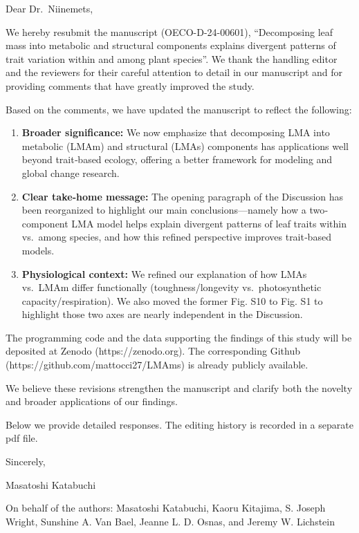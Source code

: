 \documentclass[
  12pt,
  letterpaper,
  DIV=11,
  numbers=noendperiod]{scrartcl}
\author{Masatoshi Katabuchi}
\date{2025-02-10}
\begin{document}
Dear Dr.~Niinemets,

We hereby resubmit the manuscript (OECO-D-24-00601), ``Decomposing leaf
mass into metabolic and structural components explains divergent
patterns of trait variation within and among plant species''. We thank
the handling editor and the reviewers for their careful attention to
detail in our manuscript and for providing comments that have greatly
improved the study.

Based on the comments, we have updated the manuscript to reflect the
following:

\begin{enumerate}
\def\labelenumi{\arabic{enumi}.}
\item
  \textbf{Broader significance:} We now emphasize that decomposing LMA
  into metabolic (LMAm) and structural (LMAs) components has
  applications well beyond trait‐based ecology, offering a better
  framework for modeling and global change research.
\item
  \textbf{Clear take‐home message:} The opening paragraph of the
  Discussion has been reorganized to highlight our main
  conclusions---namely how a two‐component LMA model helps explain
  divergent patterns of leaf traits within vs.~among species, and how
  this refined perspective improves trait‐based models.
\item
  \textbf{Physiological context:} We refined our explanation of how LMAs
  vs.~LMAm differ functionally (toughness/longevity vs.~photosynthetic
  capacity/respiration). We also moved the former Fig. S10 to Fig. S1 to
  highlight those two axes are nearly independent in the Discussion.
\end{enumerate}

The programming code and the data supporting the findings of this study
will be deposited at Zenodo (https://zenodo.org). The corresponding
Github (https://github.com/mattocci27/LMAms) is already publicly
available.

We believe these revisions strengthen the manuscript and clarify both
the novelty and broader applications of our findings.

Below we provide detailed responses. The editing history is recorded in
a separate pdf file.

Sincerely,

Masatoshi Katabuchi

On behalf of the authors: Masatoshi Katabuchi, Kaoru Kitajima, S. Joseph
Wright, Sunshine A. Van Bael, Jeanne L. D. Osnas, and Jeremy W.
Lichstein
\end{document}
